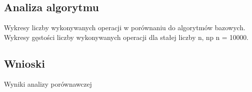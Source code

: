 \subsection{Analiza algorytmu}
Wykresy liczby wykonywanych operacji w porównaniu do algorytmów bazowych.
Wykresy gęstości liczby wykonywanych operacji dla stałej liczby n, np n = 10000.

\subsection{Wnioski}
Wyniki analizy porównawczej



